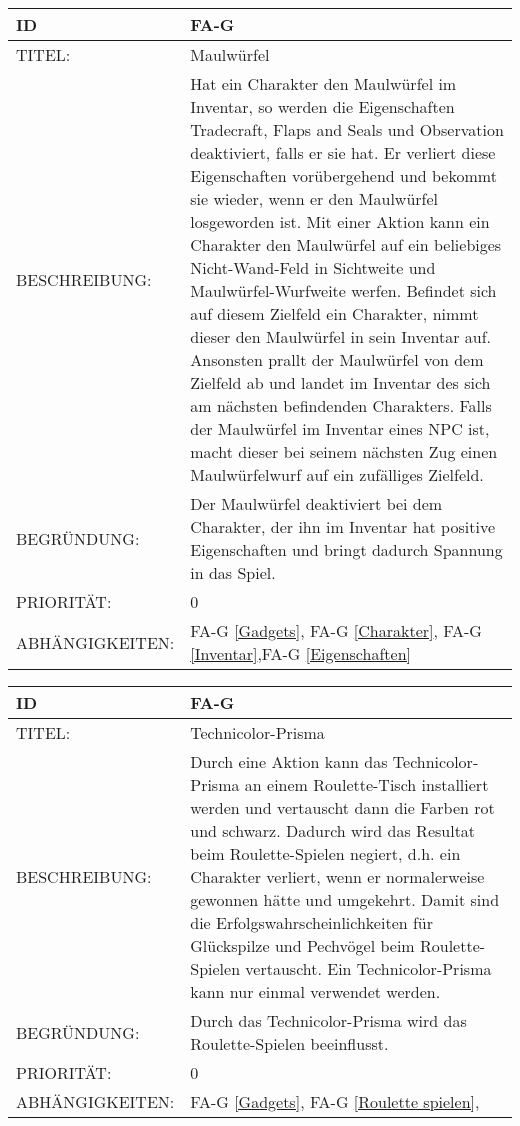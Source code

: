 \begin{tabularx}{16cm}{l|X}
	{table}\label{Maulwuerfel}
	\textbf{ID} & \textbf{FA-G \arabic{table}} \\
	\hline
	TITEL: & Maulwürfel \\
	\hline
	BESCHREIBUNG: & Hat ein Charakter den Maulwürfel im Inventar, so werden die Eigenschaften Tradecraft, Flaps and Seals und Observation deaktiviert, falls er sie hat. Er verliert diese Eigenschaften vorübergehend und bekommt sie wieder, wenn er den Maulwürfel losgeworden ist. Mit einer Aktion kann ein Charakter den Maulwürfel auf ein beliebiges Nicht-Wand-Feld in Sichtweite und Maulwürfel-Wurfweite werfen. Befindet sich auf diesem Zielfeld ein Charakter, nimmt dieser den Maulwürfel in sein Inventar auf. Ansonsten prallt der Maulwürfel von dem Zielfeld ab und landet im Inventar des sich am nächsten befindenden Charakters. Falls der Maulwürfel im Inventar eines NPC ist, macht dieser bei seinem nächsten Zug einen Maulwürfelwurf auf ein zufälliges Zielfeld. \\
	\hline
	BEGRÜNDUNG: &  Der Maulwürfel deaktiviert bei dem Charakter, der ihn im Inventar hat positive Eigenschaften und bringt dadurch Spannung in das Spiel. \\
	\hline
	PRIORITÄT: & 0\\
	\hline
	ABHÄNGIGKEITEN: & FA-G \ref{Gadgets}, FA-G \ref{Charakter}, FA-G \ref{Inventar},FA-G \ref{Eigenschaften} \\
\end{tabularx}

\begin{tabularx}{16cm}{l|X}
	{table}\label{Technicolor-Prisma}
	\textbf{ID} & \textbf{FA-G \arabic{table}} \\
	\hline
	TITEL: & Technicolor-Prisma \\
	\hline
	BESCHREIBUNG: & Durch eine Aktion kann das Technicolor-Prisma an einem Roulette-Tisch installiert werden und vertauscht dann die Farben rot und schwarz. Dadurch wird das Resultat beim Roulette-Spielen negiert, d.h. ein Charakter verliert, wenn er normalerweise gewonnen hätte und umgekehrt. Damit sind die Erfolgswahrscheinlichkeiten für Glückspilze und Pechvögel beim Roulette-Spielen vertauscht. Ein Technicolor-Prisma kann nur einmal verwendet werden. \\
	\hline
	BEGRÜNDUNG: &  Durch das Technicolor-Prisma wird das Roulette-Spielen beeinflusst. \\
	\hline
	PRIORITÄT: & 0\\
	\hline
	ABHÄNGIGKEITEN: & FA-G \ref{Gadgets}, FA-G \ref{Roulette spielen}, \\
\end{tabularx}

